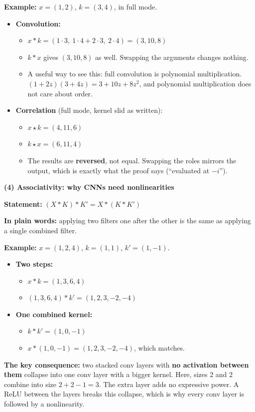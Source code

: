 \textbf{Example:} $x = (1, 2)$, $k = (3, 4)$, in full mode.
\begin{itemize}
  \item \textbf{Convolution:}
  \begin{itemize}
    \item $x * k = (1\cdot 3,\ 1\cdot 4 + 2\cdot 3,\ 2\cdot 4) = (3, 10, 8)$
    \item $k * x$ gives $(3, 10, 8)$ as well. Swapping the arguments changes nothing.
    \item A useful way to see this: full convolution is polynomial multiplication. $(1 + 2z)(3 + 4z) = 3 + 10z + 8z^2$, and polynomial multiplication does not care about order.
  \end{itemize}
  \item \textbf{Correlation} (full mode, kernel slid as written):
  \begin{itemize}
    \item $x \star k = (4, 11, 6)$
    \item $k \star x = (6, 11, 4)$
    \item The results are \textbf{reversed}, not equal. Swapping the roles mirrors the output, which is exactly what the proof says (``evaluated at $-i$'').
  \end{itemize}
\end{itemize}

\textbf{(4) Associativity: why CNNs need nonlinearities}

\textbf{Statement:} $(X * K) * K' = X * (K * K')$

\textbf{In plain words:} applying two filters one after the other is the same as applying a single combined filter.

\textbf{Example:} $x = (1, 2, 4)$, $k = (1, 1)$, $k' = (1, -1)$.
\begin{itemize}
  \item \textbf{Two steps:}
  \begin{itemize}
    \item $x * k = (1, 3, 6, 4)$
    \item $(1, 3, 6, 4) * k' = (1, 2, 3, -2, -4)$
  \end{itemize}
  \item \textbf{One combined kernel:}
  \begin{itemize}
    \item $k * k' = (1, 0, -1)$
    \item $x * (1, 0, -1) = (1, 2, 3, -2, -4)$, which matches.
  \end{itemize}
\end{itemize}
\textbf{The key consequence:} two stacked conv layers with \textbf{no activation between them} collapse into one conv layer with a bigger kernel. Here, sizes 2 and 2 combine into size $2 + 2 - 1 = 3$. The extra layer adds no expressive power. A ReLU between the layers breaks this collapse, which is why every conv layer is followed by a nonlinearity.

